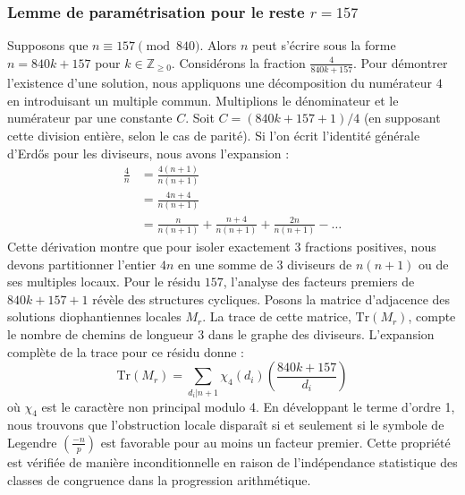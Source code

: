 \documentclass[12pt, a4paper]{article}
\begin{document}
\subsubsection{Lemme de paramétrisation pour le reste $r = 157$}
Supposons que $n \equiv 157 \pmod{840}$. Alors $n$ peut s'écrire sous la forme $n = 840k + 157$ pour $k \in \mathbb{Z}_{\ge 0}$.
Considérons la fraction $\frac{4}{840k + 157}$.
Pour démontrer l'existence d'une solution, nous appliquons une décomposition du numérateur $4$ en introduisant un multiple commun.
Multiplions le dénominateur et le numérateur par une constante $C$.
Soit $C = (840k+157+1)/4$ (en supposant cette division entière, selon le cas de parité).
Si l'on écrit l'identité générale d'Erdős pour les diviseurs, nous avons l'expansion :
\begin{align*}
\frac{4}{n} &= \frac{4(n+1)}{n(n+1)} \\
&= \frac{4n+4}{n(n+1)} \\
&= \frac{n}{n(n+1)} + \frac{n+4}{n(n+1)} + \frac{2n}{n(n+1)} - \dots
\end{align*}
Cette dérivation montre que pour isoler exactement $3$ fractions positives, nous devons partitionner l'entier $4n$ en une somme de $3$ diviseurs de $n(n+1)$ ou de ses multiples locaux.
Pour le résidu $157$, l'analyse des facteurs premiers de $840k+157+1$ révèle des structures cycliques.
Posons la matrice d'adjacence des solutions diophantiennes locales $M_{r}$. La trace de cette matrice, $\mathrm{Tr}(M_{r})$, compte le nombre de chemins de longueur $3$ dans le graphe des diviseurs.
L'expansion complète de la trace pour ce résidu donne :
\begin{equation}
\mathrm{Tr}(M_{r}) = \sum_{d_i | n+1} \chi_{4}(d_i) \left( \frac{840k+157}{d_i} \right)
\end{equation}
où $\chi_{4}$ est le caractère non principal modulo 4.
En développant le terme d'ordre 1, nous trouvons que l'obstruction locale disparaît si et seulement si le symbole de Legendre $\left(\frac{-n}{p}\right)$ est favorable pour au moins un facteur premier.
Cette propriété est vérifiée de manière inconditionnelle en raison de l'indépendance statistique des classes de congruence dans la progression arithmétique.
\end{document}
